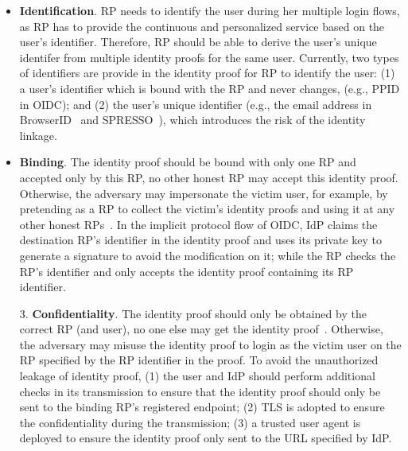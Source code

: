 \begin{itemize}
\item \textbf{Identification}. %
RP needs to identify the user during her multiple login flows,
as RP has to provide the continuous and personalized service based on the user's identifier.
Therefore, RP should be able to derive the user's  unique identifer from multiple identity proofs for the same user.
Currently, two types of identifiers are provide in the identity proof for RP to identify the user: (1) a user's identifier which is bound with the RP and never changes, (e.g., PPID in OIDC); and (2) the user's unique identifier (e.g., the email address in BrowserID~\cite{BrowserID} and SPRESSO~\cite{SPRESSO}), which introduces the risk of the identity linkage.

\item \textbf{Binding}. The identity proof should be bound with only one RP and accepted only by this RP, no other honest RP may accept this identity proof.
Otherwise, the adversary may impersonate the victim user,
for example, by pretending as a RP to collect the victim's identity proofs and using it at any other honest RPs~\cite{ChenPCTKT14, WangZLG16}.
 In the implicit protocol flow of OIDC, IdP claims the destination RP's identifier in the identity proof and uses its private key to generate a signature to  avoid the modification on it;
 while the RP checks the RP's identifier and only accepts the identity proof containing its RP identifier.
 
\item[3.] \textbf{Confidentiality}. The identity proof should only be obtained by the correct RP (and user), no one else may get the identity proof~\cite{ChenPCTKT14,FettKS16,WangZLG16}.
 Otherwise, the adversary may misuse the identity proof to login as the victim user on the RP specified by the RP identifier in the proof. 
 To avoid the unauthorized leakage of identity proof, 
 (1) the user and IdP should perform additional checks in its 
 transmission to ensure that the identity proof should only be sent to the binding RP's registered endpoint;   
 (2) TLS is adopted to ensure the confidentiality during the transmission; 
 (3) a trusted user agent is deployed to ensure the identity proof only sent to the URL specified by  IdP.


\end{itemize}
